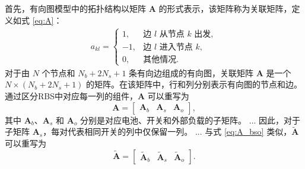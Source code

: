 \documentclass[a4paper,UTF8]{ctexart}
\begin{document}
首先，有向图模型中的拓扑结构以矩阵 $\boldsymbol{A}$ 的形式表示，该矩阵称为关联矩阵，定义如式 \eqref{eq:A}：
\begin{align}\label{eq:A}
    a_{kl}=
    \begin{cases}
        1,  & \text{边 $l$ 从节点 $k$ 出发},\\
        -1, & \text{边 $l$ 进入节点 $k$},\\
        0,  & \text{其他情况}.
    \end{cases}
\end{align}
对于由 $N$ 个节点和 $N_b+2N_s+1$ 条有向边组成的有向图，关联矩阵 $\boldsymbol{A}$ 是一个 $N\times(N_b+2N_s+1)$ 的矩阵。在该矩阵中，行和列分别表示有向图的节点和边。通过区分RBS中对应每一列的组件，$\boldsymbol{A}$ 可以重写为
\begin{equation}\label{eq:A_bso}
    \boldsymbol{A} =
    \begin{bmatrix}
        \boldsymbol{A}_b & \boldsymbol{A}_s & \boldsymbol{A}_o
    \end{bmatrix},
\end{equation}
其中 $\boldsymbol{A}_b$、$\boldsymbol{A}_s$ 和 $\boldsymbol{A}_o$ 分别是对应电池、开关和外部负载的子矩阵。
...
因此，对于子矩阵 $\boldsymbol{A}_s$，每对代表相同开关的列中仅保留一列。
...
与式 \eqref{eq:A_bso} 类似，$\boldsymbol{\tilde{A}}$ 可以重写为
\begin{equation}\label{eq:A_bso_tilde}
    \boldsymbol{\tilde{A}} =
    \begin{bmatrix}
        \boldsymbol{\tilde{A}}_b & \boldsymbol{\tilde{A}}_s & \boldsymbol{\tilde{A}}_o
    \end{bmatrix}.
\end{equation}




\end{document}
